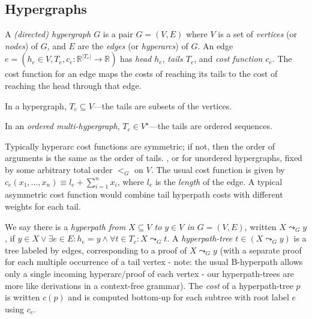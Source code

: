\documentclass[english]{article}
\newcommand\comment[1]{}
\newcommand\into{\rightarrow}
\newcommand\logand{\wedge}
\newcommand\logor{\vee}
\newcommand\reals{\mathbb{R}}
\newcommand\multiset[1]{\coll{M}(#1)}
\newcommand\seqn[2]{({#1}_{1},\ldots,{#1}_{#2})}
\newcommand{\kstar}{^{\star}}
\begin{document}
  \subsection{Hypergraphs}

  A \emph{(directed) hypergraph $G$} is a pair $G=(V,E)$ where $V$ is a set
  of \emph{vertices} (or \emph{nodes}) of $G$, and $E$ are the \emph{edges} (or
  \emph{hyperarcs}) of $G$.  An edge
  $e=(h_{e}\in{V},T_{e},c_{e}:\reals^{|T_{e}|}\into \reals)$ has \emph{head
    $h_{e}$}, \emph{tails $T_{e}$}, and \emph{cost function $c_{e}$}.  The cost
  function for an edge maps the costs of reaching its tails to the cost of
  reaching the head through that edge.

  In a hypergraph, $T_{e}\subseteq V$---the tails are subsets of the vertices.

\comment{For a \emph{multi-hypergraph}, $T_{e}\in{\multiset{V}}$---the tails are a
  multiset of vertices.  } In an \emph{ordered multi-hypergraph},
  $T_{e}\in{V\kstar}$---the tails are ordered sequences.

  Typically hyperarc cost functions are symmetric; if not, then the order of
  arguments is the same as the order of tails.
, or for unordered hypergraphs,  fixed by some arbitrary total order $<_{G}$ on $V$.
  The usual cost function
  is given by $c_{e}\seqn{x}{n}\equiv l_{e}+\sum_{i=1}^{n}x_{i}$, where $l_{e}$
  is the \emph{length} of the edge.  A typical asymmetric cost function would
  combine tail hyperpath costs with different weights for each tail.

  We say there is a \emph{hyperpath from $X\subseteq V$ to $y\in{V}$ in
  $G=(V,E)$}, written $X\leadsto_{G}y$, if $y\in{X}\logor \exists e\in{E} :
  h_{e}=y \logand \forall t\in{T_{e}} : X\leadsto_{G}t$.  A \emph{hyperpath-tree
  $t\in{(X\leadsto_{G}y)}$} is a tree labeled by edges, corresponding to a proof
  of $X\leadsto_{G}y$ (with a separate proof for each multiple occurrence of a
  tail vertex - note: the usual B-hyperpath allows only a single incoming
  hyperarc/proof of each vertex - our hyperpath-trees are more like derivations
  in a context-free grammar).  The \emph{cost} of a hyperpath-tree $p$ is
  written $c(p)$ and is computed bottom-up for each subtree with root label $e$
  using $c_{e}$.
\end{document}
